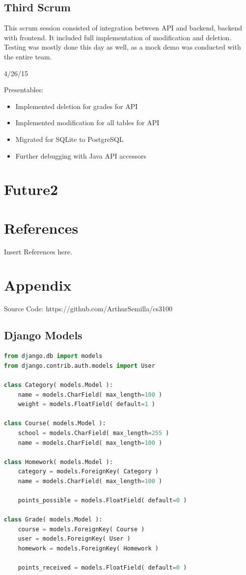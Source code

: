 \documentclass[a4paper]{article} %
\begin{document}
\subsection{Third Scrum}

This scrum session consisted of integration between API and backend, backend with frontend. It included full implementation of modification and deletion. Testing was mostly done this day as well, as a mock demo was conducted with the entire team. 

4/26/15


Presentables: 

\begin{itemize}
  \item Implemented deletion for grades for API
    \item Implemented modification for all tables for API
    \item Migrated for SQLite to PostgreSQL
    \item Further debugging with Java API accessors
\end{itemize}


\section{Future2}

\section{References}

Insert References here.

\section{Appendix}

Source Code: https://github.com/ArthurSemilla/cs3100


\pagebreak
\subsection{Django Models} \label{Django Models}

\begin{lstlisting}[language=Python]
from django.db import models
from django.contrib.auth.models import User

class Category( models.Model ):
    name = models.CharField( max_length=100 )
    weight = models.FloatField( default=1 )

class Course( models.Model ):
    school = models.CharField( max_length=255 )
    name = models.CharField( max_length=100 )

class Homework( models.Model ):
    category = models.ForeignKey( Category )
    name = models.CharField( max_length=100 )

    points_possible = models.FloatField( default=0 )

class Grade( models.Model ):
    course = models.ForeignKey( Course )
    user = models.ForeignKey( User )
    homework = models.ForeignKey( Homework )
    
    points_received = models.FloatField( default=0 )
\end{lstlisting}
\end{document}
